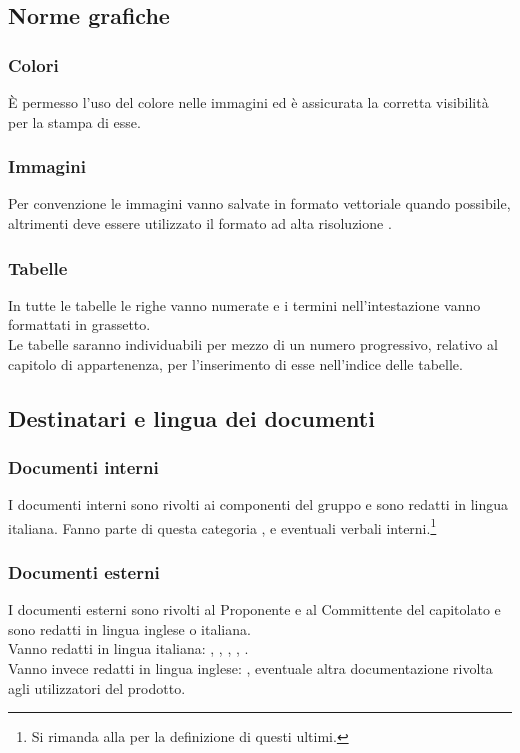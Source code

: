 \subsection{Norme grafiche}

\subsubsection{Colori}
\`{E} permesso l'uso del colore nelle immagini ed è assicurata la corretta visibilità per la stampa di esse.

\subsubsection{Immagini}
Per convenzione le immagini vanno salvate in formato vettoriale  quando possibile, altrimenti deve essere utilizzato il formato ad alta risoluzione .

\subsubsection{Tabelle}
In tutte le tabelle le righe vanno numerate e i termini nell'intestazione vanno formattati in grassetto.
\\
Le tabelle saranno individuabili per mezzo di un numero progressivo, relativo al capitolo di appartenenza, per l'inserimento di esse nell'indice delle tabelle.

\subsection{Destinatari e lingua dei documenti}
\subsubsection{Documenti interni}
I documenti interni sono rivolti ai componenti del gruppo e sono redatti in lingua italiana. Fanno parte di questa categoria \NormeDiProgetto, \StudioDiFattibilita{} e eventuali verbali interni.\footnote[1]{Si rimanda alla  per la definizione di questi ultimi.}

\subsubsection{Documenti esterni}
I documenti esterni sono rivolti al Proponente e al Committente del capitolato e sono redatti in lingua inglese o italiana.\\
Vanno redatti in lingua italiana: \PianoDiProgetto, \PianoDiQualifica, \SpecificaTecnica, \DefinizioneDiProdotto, \Glossario.\\
Vanno invece redatti in lingua inglese: \ManualeUtente, eventuale altra documentazione rivolta agli utilizzatori del prodotto.

